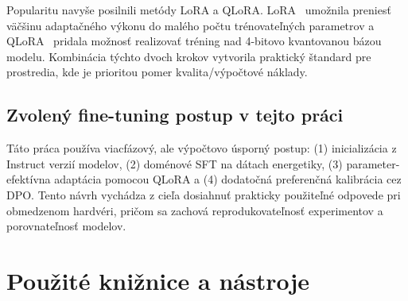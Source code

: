 Popularitu navyše posilnili metódy LoRA a QLoRA. LoRA~\cite{Hu2021LoRA} umožnila preniesť väčšinu adaptačného výkonu do malého počtu trénovateľných parametrov a QLoRA~\cite{Dettmers2023QLoRA} pridala možnosť realizovať tréning nad 4-bitovo kvantovanou bázou modelu. Kombinácia týchto dvoch krokov vytvorila praktický štandard pre prostredia, kde je prioritou pomer kvalita/výpočtové náklady.

\subsection{Zvolený fine-tuning postup v tejto práci}

Táto práca používa viacfázový, ale výpočtovo úsporný postup: (1) inicializácia z Instruct verzií modelov, (2) doménové SFT na dátach energetiky, (3) parameter-efektívna adaptácia pomocou QLoRA a (4) dodatočná preferenčná kalibrácia cez DPO. Tento návrh vychádza z cieľa dosiahnuť prakticky použiteľné odpovede pri obmedzenom hardvéri, pričom sa zachová reprodukovateľnosť experimentov a porovnateľnosť modelov.


\section{Použité knižnice a nástroje}

